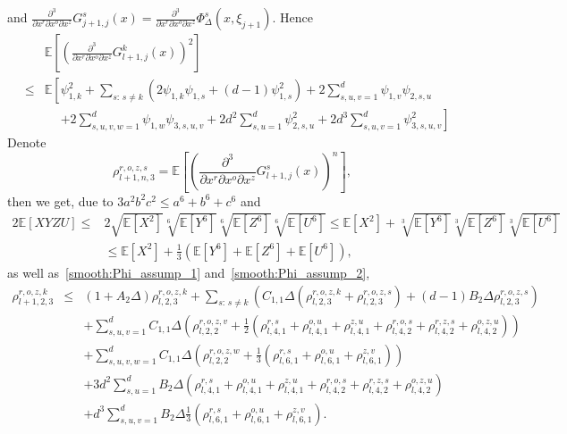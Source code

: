 \documentclass[11pt,a4paper]{amsart}
\theoremstyle{plain}
\theoremstyle{definition}
\theoremstyle{remark}
\numberwithin{equation}{section}
\newcommand*{\EE}{\mathbb E}
\begin{document}
and $\frac{\partial^3}{\partial x^r\partial x^o\partial x^z}G_{j+1,j}^s(x)=\frac{\partial^3}{\partial x^r\partial x^o\partial x^z}\Phi_{\Delta}^s\left(x,\xi_{j+1}\right)$.
Hence 
\begin{eqnarray*}
&&\EE\left[\left(\frac{\partial^3}{\partial x^r\partial x^o\partial x^z}G_{l+1,j}^k(x)\right)^{2}\right]\\
&\leq&\EE\left[\psi_{1,k}^2+\sum_{s:\,s\neq k}\left(2\psi_{1,k}\psi_{1,s}+(d-1)\psi_{1,s}^2\right)+2\sum_{s,u,v=1}^d\psi_{1,v}\psi_{2,s,u}\right.\\
&&\phantom{\EE\left[\right.}\left.+2\sum_{s,u,v,w=1}^d\psi_{1,w}\psi_{3,s,u,v}+2d^2\sum_{s,u=1}^d\psi_{2,s,u}^2+2d^3\sum_{s,u,v=1}^d\psi_{3,s,u,v}^2\right]
\end{eqnarray*}
Denote 
\[
\rho_{l+1,n,3}^{r,o,z,s}=\EE\left[\left(\frac{\partial^3}{\partial x^r\partial x^o\partial x^z}G_{l+1,j}^s(x)\right)^{n}\right],
\]
then we get, due to $3a^2b^2c^2\le a^6+b^6+c^6$ and
\begin{align*}
2\EE\left[XYZU\right]\le & 2\sqrt{\EE\left[X^2\right]}\sqrt[6]{\EE\left[Y^6\right]}\sqrt[6]{\EE\left[Z^6\right]}\sqrt[6]{\EE\left[U^6\right]}\le \EE\left[X^2\right]+\sqrt[3]{\EE\left[Y^6\right]}\sqrt[3]{\EE\left[Z^6\right]}\sqrt[3]{\EE\left[U^6\right]}\\
&\le \EE\left[X^2\right]+\frac{1}{3}\left(\EE\left[Y^6\right]+\EE\left[Z^6\right]+\EE\left[U^6\right]\right),
\end{align*}
as well as~\eqref{smooth:Phi_assump_1} and~\eqref{smooth:Phi_assump_2},
\begin{eqnarray*}
\rho_{l+1,2,3}^{r,o,z,k} & \leq & (1+A_{2}\Delta)\rho_{l,2,3}^{r,o,z,k}
+\sum_{s:\,s\neq k}\left(C_{1,1}\Delta(\rho_{l,2,3}^{r,o,z,k}+\rho_{l,2,3}^{r,o,z,s})+(d-1)B_{2}\Delta\rho_{l,2,3}^{r,o,z,s}\right)\\
&&+\sum_{s,u,v=1}^d C_{1,1}\Delta\left(\rho_{l,2,2}^{r,o,z,v}+\frac{1}{2}\left(\rho_{l,4,1}^{r,s}+\rho_{l,4,1}^{o,u}+\rho_{l,4,1}^{z,u}+\rho_{l,4,2}^{r,o,s}+\rho_{l,4,2}^{r,z,s}+\rho_{l,4,2}^{o,z,u}\right)\right)\\
&&+\sum_{s,u,v,w=1}^d C_{1,1}\Delta\left(\rho_{l,2,2}^{r,o,z,w}+\frac{1}{3}\left(\rho_{l,6,1}^{r,s}+\rho_{l,6,1}^{o,u}+\rho_{l,6,1}^{z,v}\right)\right)\\
&&+3d^2\sum_{s,u=1}^dB_{2}\Delta\left(\rho_{l,4,1}^{r,s}+\rho_{l,4,1}^{o,u}+\rho_{l,4,1}^{z,u}+\rho_{l,4,2}^{r,o,s}+\rho_{l,4,2}^{r,z,s}+\rho_{l,4,2}^{o,z,u}\right)\\
&&+d^3\sum_{s,u,v=1}^dB_{2}\Delta\frac{1}{3}\left(\rho_{l,6,1}^{r,s}+\rho_{l,6,1}^{o,u}+\rho_{l,6,1}^{z,v}\right).
\end{eqnarray*}
\end{document}
